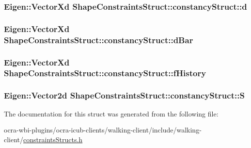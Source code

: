 \hypertarget{structShapeConstraintsStruct_1_1constancyStruct_a361cd12d62134f9ab3597d503bbc34b5}{
\subsubsection[{d}]{\setlength{\rightskip}{0pt plus 5cm}\-Eigen\-::\-Vector\-Xd {\bf \-Shape\-Constraints\-Struct\-::constancy\-Struct\-::d}}}\label{structShapeConstraintsStruct_1_1constancyStruct_a361cd12d62134f9ab3597d503bbc34b5}
\hypertarget{structShapeConstraintsStruct_1_1constancyStruct_a5f11451bd2f968b7ccc0905229a3f4bf}{
\subsubsection[{d\-Bar}]{\setlength{\rightskip}{0pt plus 5cm}\-Eigen\-::\-Vector\-Xd {\bf \-Shape\-Constraints\-Struct\-::constancy\-Struct\-::d\-Bar}}}\label{structShapeConstraintsStruct_1_1constancyStruct_a5f11451bd2f968b7ccc0905229a3f4bf}
\hypertarget{structShapeConstraintsStruct_1_1constancyStruct_a7dff57685375ede5909c7f732b2bdd8e}{
\subsubsection[{f\-History}]{\setlength{\rightskip}{0pt plus 5cm}\-Eigen\-::\-Vector\-Xd {\bf \-Shape\-Constraints\-Struct\-::constancy\-Struct\-::f\-History}}}\label{structShapeConstraintsStruct_1_1constancyStruct_a7dff57685375ede5909c7f732b2bdd8e}
\hypertarget{structShapeConstraintsStruct_1_1constancyStruct_a5101af8a66eb956ac4734155f229f330}{
\subsubsection[{\-S}]{\setlength{\rightskip}{0pt plus 5cm}\-Eigen\-::\-Vector2d {\bf \-Shape\-Constraints\-Struct\-::constancy\-Struct\-::\-S}}}\label{structShapeConstraintsStruct_1_1constancyStruct_a5101af8a66eb956ac4734155f229f330}


\-The documentation for this struct was generated from the following file\-:\begin{DoxyCompactItemize}
\item 
ocra-\/wbi-\/plugins/ocra-\/icub-\/clients/walking-\/client/include/walking-\/client/\hyperlink{constraintsStructs_8h}{constraints\-Structs.\-h}\end{DoxyCompactItemize}
